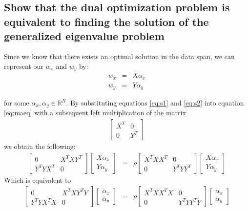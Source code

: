 \documentclass[a4paper, 12pt, titlepage]{article}
\begin{document}
\subsection*{Show that the dual optimization
problem is equivalent to finding the solution of the generalized eigenvalue problem}
Since we know that there exists an optimal solution in the data span, we can represent our $w_x$ and $w_y$ by:
\begin{eqnarray}
	w_x &=& X\alpha_x \label{eq:s1}\\
	w_y &=& Y\alpha_y \label{eq:s2}
\end{eqnarray}

for some $\alpha_x, \alpha_y \in \mathbb{R}^{N}$.
By substituting equations \eqref{eq:s1} and \eqref{eq:s2} into equation \eqref{eq:maeq} with a subsequent left multiplication of the matrix 
\begin{eqnarray*}
	\begin{bmatrix}
		X^T & 0\\
		0 & Y^T
	\end{bmatrix}
\end{eqnarray*}
we obtain the following:
\begin{eqnarray*}
	\begin{bmatrix}
		0 & X^TXY^T\\
		Y^TYX^T & 0
	\end{bmatrix}
	\begin{bmatrix}
		X\alpha_x\\
		Y\alpha_y
	\end{bmatrix} &=& \rho
	\begin{bmatrix}
		X^T X X^T & 0\\
		0 & Y^T Y Y^T
	\end{bmatrix}
	\begin{bmatrix}
		X\alpha_x\\
		Y\alpha_y
	\end{bmatrix}
\end{eqnarray*}
Which is equivalent to
\begin{eqnarray*}
	\begin{bmatrix}
		0 & X^TXY^TY\\
		Y^TYX^TX & 0
	\end{bmatrix}
	\begin{bmatrix}
		\alpha_x\\
		\alpha_y
	\end{bmatrix} &=& \rho
	\begin{bmatrix}
		X^T X X^T X & 0\\
		0 & Y^T Y Y^T Y
	\end{bmatrix}
	\begin{bmatrix}
		\alpha_x\\
		\alpha_y
	\end{bmatrix}
\end{eqnarray*}
\end{document}

